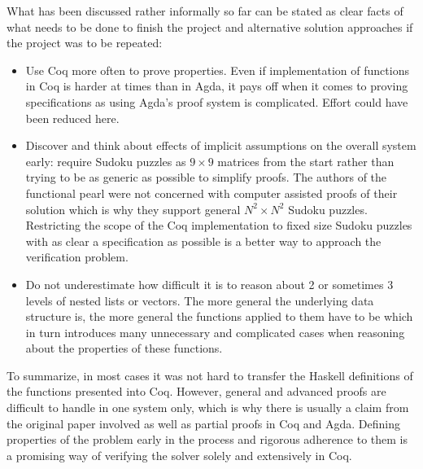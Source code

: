 \documentclass[a4paper,11pt]{article}
\begin{document}
What has been discussed rather informally so far can be stated as clear facts of what needs to be done to finish the project and alternative solution approaches if the project was to be repeated:
\begin{itemize}
  \item Use Coq more often to prove properties. Even if implementation of functions in Coq is harder at times than in Agda, it pays off when it comes to proving specifications as using Agda's proof system is complicated. Effort could have been reduced here. 
  \item Discover and think about effects of implicit assumptions on the overall system early: require Sudoku puzzles as \(9 \times 9\) matrices from the start rather than trying to be as generic as possible to simplify proofs. The authors of the functional pearl were not concerned with computer assisted proofs of their solution which is why they support general \(N^2 \times N^2\) Sudoku puzzles. Restricting the scope of the Coq implementation to fixed size Sudoku puzzles with as clear a specification as possible is a better way to approach the verification problem.
  \item Do not underestimate how difficult it is to reason about 2 or sometimes 3 levels of nested lists or vectors. The more general the underlying data structure is, the more general the functions applied to them have to be which in turn introduces many unnecessary and complicated cases when reasoning about the properties of these functions.
\end{itemize}

To summarize, in most cases it was not hard to transfer the Haskell definitions of the functions presented into Coq. However, general and advanced proofs are difficult to handle in one system only, which is why there is usually a claim from the original paper involved as well as partial proofs in Coq and Agda. Defining properties of the problem early in the process and rigorous adherence to them is a promising way of verifying the solver solely and extensively in Coq.
\end{document}
